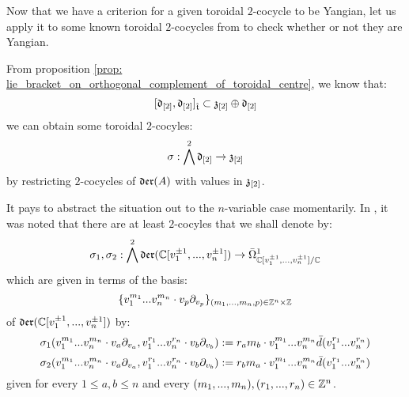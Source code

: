        Now that we have a criterion for a given toroidal $2$-cocycle to be Yangian, let us apply it to some known toroidal $2$-cocycles from \cite{billig_energy_momentum_tensor} to check whether or not they are Yangian. 
        \begin{example} \label{example: yangian_cocycles_(counter)_examples}
            From proposition \ref{prop: lie_bracket_on_orthogonal_complement_of_toroidal_centre}, we know that:
                $$[\mathfrak{d}_{[2]}, \mathfrak{d}_{[2]}]_{\hat{\mathfrak{t}}} \subset \mathfrak{z}_{[2]} \oplus \mathfrak{d}_{[2]}$$
            we can obtain some toroidal $2$-cocyles:
                $$\sigma: \bigwedge^2 \mathfrak{d}_{[2]} \to \mathfrak{z}_{[2]}$$
            by restricting $2$-cocycles of $\mathfrak{der}(A)$ with values in $\mathfrak{z}_{[2]}$.

            It pays to abstract the situation out to the $n$-variable case momentarily. In \cite[p. 5, below Equation 1.3]{billig_energy_momentum_tensor}, it was noted that there are at least $2$-cocyles that we shall denote by:
                $$\sigma_1, \sigma_2: \bigwedge^2 \mathfrak{der}(\mathbb{C}[v_1^{\pm 1}, ..., v_n^{\pm 1}]) \to \bar{\Omega}^1_{\mathbb{C}[v_1^{\pm 1}, ..., v_n^{\pm 1}]/\mathbb{C}}$$
            which are given in terms of the basis:
                $$\{ v_1^{m_1} ... v_n^{m_n} \cdot v_p \del_{v_p} \}_{(m_1, ..., m_n, p) \in \Z^n \x \Z}$$
            of $\mathfrak{der}(\mathbb{C}[v_1^{\pm 1}, ..., v_n^{\pm 1}])$ by:
                $$\sigma_1(v_1^{m_1} ... v_n^{m_n} \cdot v_a \partial_{v_a}, v_1^{r_1} ... v_n^{r_n} \cdot v_b \partial_{v_b}) := r_a m_b \cdot v_1^{m_1} ... v_n^{m_n} \bar{d}( v_1^{r_1} ... v_n^{r_n} )$$
                $$\sigma_2(v_1^{m_1} ... v_n^{m_n} \cdot v_a \partial_{v_a}, v_1^{r_1} ... v_n^{r_n} \cdot v_b \partial_{v_b}) := r_b m_a \cdot v_1^{m_1} ... v_n^{m_n} \bar{d}( v_1^{r_1} ... v_n^{r_n} )$$
            given for every $1 \leq a, b \leq n$ and every $(m_1, ..., m_n), (r_1, ..., r_n) \in \mathbb{Z}^n$. 


\end{example}
